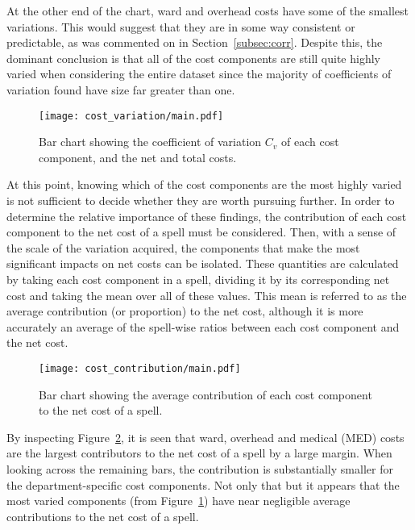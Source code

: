At the other end of the chart, ward and overhead costs have some of the smallest
variations. This would suggest that they are in some way consistent or
predictable, as was commented on in Section~\ref{subsec:corr}. Despite this, the
dominant conclusion is that all of the cost components are still quite highly
varied when considering the entire dataset since the majority of coefficients of
variation found have size far greater than one. 

\begin{figure}[h]
    \centering
    \texttt{[image: cost\_variation/main.pdf]}
    \caption{Bar chart showing the coefficient of variation \(C_{v}\) of each
        cost component, and the net and total costs.}\label{fig:cost_variation}
\end{figure}

At this point, knowing which of the cost components are the most highly varied
is not sufficient to decide whether they are worth pursuing further. In order to
determine the relative importance of these findings, the contribution of each
cost component to the net cost of a spell must be considered. Then, with a sense
of the scale of the variation acquired, the components that make the most
significant impacts on net costs can be isolated. These quantities are
calculated by taking each cost component in a spell, dividing it by its
corresponding net cost and taking the mean over all of these values. This mean
is referred to as the average contribution (or proportion) to the net cost,
although it is more accurately an average of the spell-wise ratios between each
cost component and the net cost.

\begin{figure}[h]
    \centering
    \texttt{[image: cost\_contribution/main.pdf]}
    \caption{Bar chart showing the average contribution of each cost component
        to the net cost of a spell.}\label{fig:cost_contribution}
\end{figure}

By inspecting Figure~\ref{fig:cost_contribution}, it is seen that ward, overhead
and medical (MED) costs are the largest contributors to the net cost of a spell
by a large margin. When looking across the remaining bars, the contribution is
substantially smaller for the department-specific cost components. Not only that
but it appears that the most varied components (from
Figure~\ref{fig:cost_variation}) have near negligible average contributions to
the net cost of a spell.

